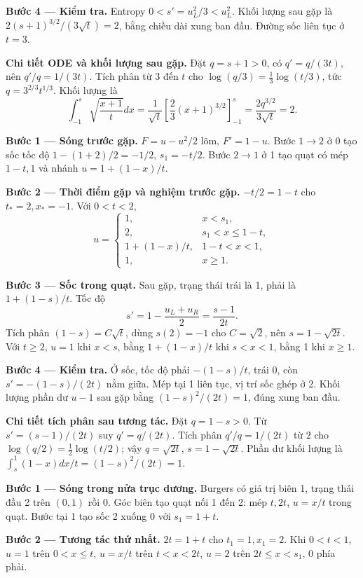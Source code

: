 \textbf{Bước 4 — Kiểm tra.} Entropy $0<s'=u_L^2/3<u_L^2$. Khối lượng sau gặp là $2(s+1)^{3/2}/(3\sqrt t)=2$, bằng chiều dài xung ban đầu. Đường sốc liên tục ở $t=3$.

\textbf{Chi tiết ODE và khối lượng sau gặp.} Đặt $q=s+1>0$, có $q'=q/(3t)$, nên $q'/q=1/(3t)$. Tích phân từ $3$ đến $t$ cho $\log(q/3)=\frac13\log(t/3)$, tức $q=3^{2/3}t^{1/3}$. Khối lượng là
\[\int_{-1}^{s}\sqrt{\frac{x+1}{t}}dx
=\frac1{\sqrt t}\left[\frac23(x+1)^{3/2}\right]_{-1}^{s}
=\frac{2q^{3/2}}{3\sqrt t}=2.\]

\textbf{Bước 1 — Sóng trước gặp.} $F=u-u^2/2$ lõm, $F'=1-u$. Bước $1\to2$ ở 0 tạo sốc tốc độ $1-(1+2)/2=-1/2$, $s_1=-t/2$. Bước $2\to1$ ở 1 tạo quạt có mép $1-t,1$ và nhánh $u=1+(1-x)/t$.

\textbf{Bước 2 — Thời điểm gặp và nghiệm trước gặp.} $-t/2=1-t$ cho $t_*=2,x_*=-1$. Với $0<t<2$,
\[u=\begin{cases}1,&x<s_1,\\2,&s_1<x\le1-t,\\1+(1-x)/t,&1-t<x<1,\\1,&x\ge1.\end{cases}\]

\textbf{Bước 3 — Sốc trong quạt.} Sau gặp, trạng thái trái là 1, phải là $1+(1-s)/t$. Tốc độ
\[s'=1-\frac{u_L+u_R}{2}=\frac{s-1}{2t}.\]
Tích phân $(1-s)=C\sqrt t$, dùng $s(2)=-1$ cho $C=\sqrt2$, nên $s=1-\sqrt{2t}$. Với $t\ge2$, $u=1$ khi $x<s$, bằng $1+(1-x)/t$ khi $s<x<1$, bằng 1 khi $x\ge1$.

\textbf{Bước 4 — Kiểm tra.} Ở sốc, tốc độ phải $-(1-s)/t$, trái 0, còn $s'=-(1-s)/(2t)$ nằm giữa. Mép tại 1 liên tục, vị trí sốc ghép ở 2. Khối lượng phần dư $u-1$ sau gặp bằng $(1-s)^2/(2t)=1$, đúng xung ban đầu.

\textbf{Chi tiết tích phân sau tương tác.} Đặt $q=1-s>0$. Từ $s'=(s-1)/(2t)$ suy $q'=q/(2t)$. Tích phân $q'/q=1/(2t)$ từ $2$ cho $\log(q/2)=\frac12\log(t/2)$; vậy $q=\sqrt{2t}$, $s=1-\sqrt{2t}$. Phần dư khối lượng là $\int_s^1(1-x)dx/t=(1-s)^2/(2t)=1$.

\textbf{Bước 1 — Sóng trong nửa trục dương.} Burgers có giá trị biên 1, trạng thái đầu 2 trên $(0,1)$ rồi 0. Góc biên tạo quạt nối 1 đến 2: mép $t,2t$, $u=x/t$ trong quạt. Bước tại 1 tạo sốc 2 xuống 0 với $s_1=1+t$.

\textbf{Bước 2 — Tương tác thứ nhất.} $2t=1+t$ cho $t_1=1,x_1=2$. Khi $0<t<1$, $u=1$ trên $0<x\le t$, $u=x/t$ trên $t<x<2t$, $u=2$ trên $2t\le x<s_1$, 0 phía phải.


